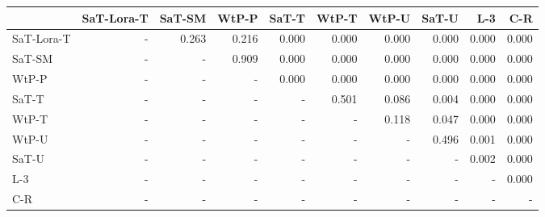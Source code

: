 \begin{tabular}{lrrrrrrrrr}
\toprule
 & SaT-Lora-T & SaT-SM & WtP-P & SaT-T & WtP-T & WtP-U & SaT-U & L-3 & C-R \\
\midrule
SaT-Lora-T & - & 0.263 & 0.216 & 0.000 & 0.000 & 0.000 & 0.000 & 0.000 & 0.000 \\
SaT-SM & - & - & 0.909 & 0.000 & 0.000 & 0.000 & 0.000 & 0.000 & 0.000 \\
WtP-P & - & - & - & 0.000 & 0.000 & 0.000 & 0.000 & 0.000 & 0.000 \\
SaT-T & - & - & - & - & 0.501 & 0.086 & 0.004 & 0.000 & 0.000 \\
WtP-T & - & - & - & - & - & 0.118 & 0.047 & 0.000 & 0.000 \\
WtP-U & - & - & - & - & - & - & 0.496 & 0.001 & 0.000 \\
SaT-U & - & - & - & - & - & - & - & 0.002 & 0.000 \\
L-3 & - & - & - & - & - & - & - & - & 0.000 \\
C-R & - & - & - & - & - & - & - & - & - \\
\bottomrule
\end{tabular}

